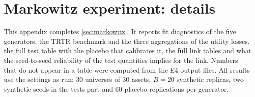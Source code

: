 \section{Markowitz experiment: details}\label{app:mk}

This appendix completes \cref{sec:markowitz}. It reports fit diagnostics of the five generators,
the TRTR benchmark and the three aggregations of the utility losses, the full test table with
the placebo that calibrates it, the full link tables and what the seed-to-seed reliability of the
test quantities implies for the link. Numbers that do not appear in a table
were computed from the E4 output files. All results use the settings as run: 30 universes of 30
assets, $B=20$ synthetic replicas, two synthetic seeds in the tests part and 60 placebo
replications per generator.

